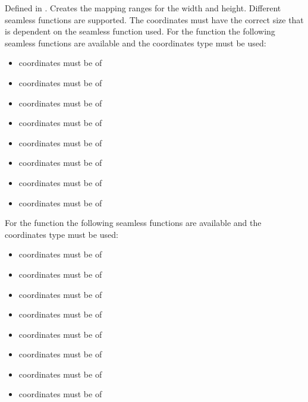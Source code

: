 Defined in .
Creates the mapping ranges for the width and height. Different seamless functions are supported.
The coordinates must have the correct size that is dependent on the seamless function used.
For the  function the following seamless functions are available and the
coordinates type must be used:

\begin{itemize}
\item {} coordinates must be of 
\item {} coordinates must be of 
\item {} coordinates must be of 
\item {} coordinates must be of 
\item {} coordinates must be of 
\item {} coordinates must be of 
\item {} coordinates must be of 
\item {} coordinates must be of 
\end{itemize}

For the  function the following seamless functions are available and the
coordinates type must be used:

\begin{itemize}
\item {} coordinates must be of 
\item {} coordinates must be of 
\item {} coordinates must be of 
\item {} coordinates must be of 
\item {} coordinates must be of 
\item {} coordinates must be of 
\item {} coordinates must be of 
\item {} coordinates must be of 
\end{itemize}

